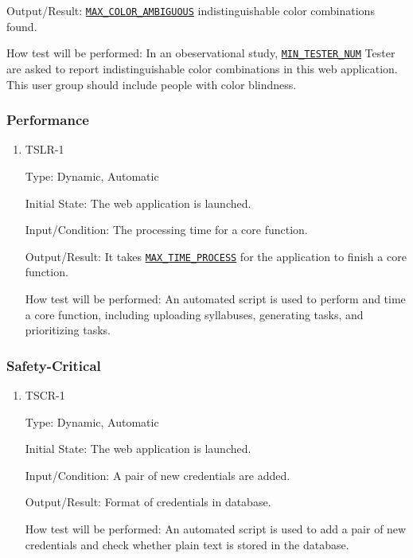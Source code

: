 \documentclass[12pt, titlepage]{article}
\begin{document}
\begin{enumerate}
\begin{enumerate}
Output/Result: \hyperref[MAX_COLOR_AMBIGUOUS]{\texttt{MAX\_COLOR\_AMBIGUOUS}} indistinguishable color combinations found.
					
How test will be performed: In an obeservational study, \hyperref[MIN_TESTER_NUM]{\texttt{MIN\_TESTER\_NUM}} Tester are asked to report indistinguishable color combinations in this web application. This user group should include people with color blindness.


\end{enumerate}

\subsubsection{Performance}

\begin{enumerate}
\item{TSLR-1\\}\label{TSLR-1}

Type: Dynamic, Automatic
					
Initial State: The web application is launched.
					
Input/Condition: The processing time for a core function.
					
Output/Result: It takes \hyperref[MAX_TIME_PROCESS]{\texttt{MAX\_TIME\_PROCESS}} for the application to finish a core function.
					
How test will be performed: An automated script is used to perform and time a core function, including uploading syllabuses, generating tasks, and prioritizing tasks.

\end{enumerate}
\subsubsection{Safety-Critical}

\begin{enumerate}
\item{TSCR-1\\}\label{TSCR-1}

Type: Dynamic, Automatic
					
Initial State: The web application is launched.
					
Input/Condition: A pair of new credentials are added.
					
Output/Result: Format of credentials in database.
					
How test will be performed: An automated script is used to add a pair of new credentials and check whether plain text is stored in the database.


\end{enumerate}
\end{enumerate}
\end{document}
